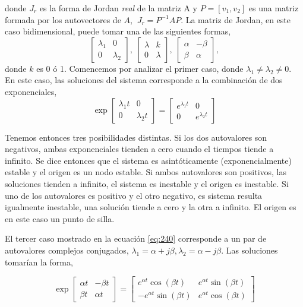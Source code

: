 donde  $J_r$ es la forma de Jordan \emph{real} de la matriz A y $P=[v_1,v_2]$ es una matriz formada por los autovectores de $A$, $\ J_r=P^{-1}AP$. La matriz de Jordan, en este caso bidimensional, puede tomar una de las siguientes formas,
\begin{equation}\label{eq:240}
\begin{bmatrix}
\lambda_1 & 0\\ 0 & \lambda_2
\end{bmatrix},\ \begin{bmatrix}
\lambda & k\\ 0 & \lambda
\end{bmatrix},\ \begin{bmatrix}
\alpha & -\beta\\ \beta & \alpha
\end{bmatrix},
\end{equation}
donde $k$ es 0 ó 1.
Comencemos por analizar el primer caso, donde $\lambda_1 \ne \lambda_2 \ne 0$. En este caso, las soluciones del sistema corresponde a la combinación de dos exponenciales,
\begin{equation}
\exp\begin{bmatrix}
\lambda_1t &0 \\
0& \lambda_2t
\end{bmatrix}=\begin{bmatrix}
e^{\lambda_1t} &0 \\
0& e^{\lambda_2t} 
\end{bmatrix}
\end{equation}



Tenemos entonces tres posibilidades distintas. Si los dos autovalores son negativos, ambas exponenciales tienden a cero cuando el tiempos tiende a infinito. Se dice entonces que el sistema es asintóticamente (exponencialmente) estable y el origen es un nodo estable. Si ambos autovalores son positivos, las soluciones tienden a infinito, el sistema es inestable y el origen es  inestable. Si uno de los autovalores es positivo y el otro negativo, es sistema resulta igualmente inestable, una solución tiende a cero y la otra a infinito. El origen es en este caso un punto de silla.

El tercer caso mostrado en la ecuación \ref{eq:240} corresponde a un par de autovalores complejos conjugados,
$\lambda_1 = \alpha + j \beta, \lambda_2 =\alpha -j\beta$.  Las soluciones tomarían la forma,

\begin{equation}
\exp\begin{bmatrix}
\alpha t & -\beta t\\ \beta t & \alpha t
\end{bmatrix} = 
\begin{bmatrix}
e^{\alpha t}\cos(\beta t) & e^{\alpha t}\sin(\beta t)\\
-e^{\alpha t}\sin(\beta t) & e^{\alpha t}\cos(\beta t)
\end{bmatrix}
\end{equation}

